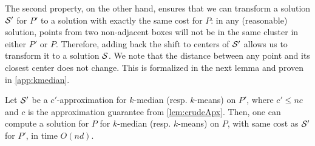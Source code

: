 The second property, on the other hand, ensures that we can transform a solution $\mathcal S'$ for $P'$ to a solution with exactly the same cost for $P$: in any
(reasonable) solution, points from two non-adjacent boxes will not be in the same cluster in either $P'$ or $P$. Therefore, adding back the shift to centers of
$\mathcal S'$ allows us to transform it to a solution $\mathcal S$. We note that the distance between any point and its closest center does not change. This is formalized
in the next lemma and proven in \cref{app:kmedian}.

\begin{lemma}
Let $\mathcal S'$ be a $c'$-approximation for  $k$-median (resp. $k$-means) on $P'$, where $c' \leq nc$ and $c$ is the approximation guarantee from
\cref{lem:crudeApx}. Then, one can compute a solution for $P$ for $k$-median (resp. $k$-means) on $P$, with same cost as $\mathcal S'$ for $P'$, in time $O(nd)$.
\end{lemma}
